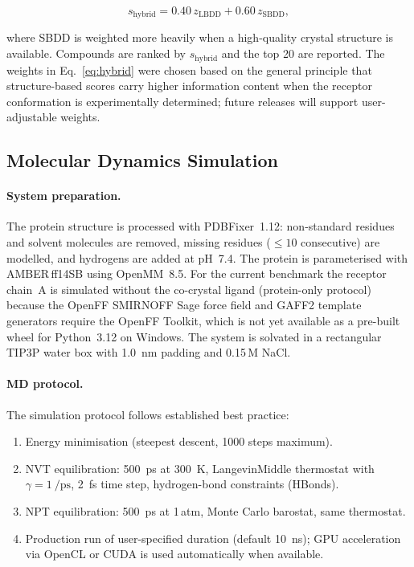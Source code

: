 \documentclass[journal=jcisd8,manuscript=article]{achemso}
\begin{document}
\begin{equation}
  s_{\mathrm{hybrid}} = 0.40\,z_{\mathrm{LBDD}} + 0.60\,z_{\mathrm{SBDD}},
  \label{eq:hybrid}
\end{equation}

where SBDD is weighted more heavily when a high-quality crystal structure
is available.  Compounds are ranked by $s_{\mathrm{hybrid}}$ and the top
20 are reported.  The weights in Eq.~\ref{eq:hybrid} were chosen based
on the general principle that structure-based scores carry higher
information content when the receptor conformation is experimentally
determined; future releases will support user-adjustable weights.

\subsection{Molecular Dynamics Simulation}

\paragraph{System preparation.}
The protein structure is processed with PDBFixer~1.12:\cite{eastman2024openmm8}
non-standard residues and solvent molecules are removed, missing residues
($\leq 10$ consecutive) are modelled, and hydrogens are added at pH~7.4.
The protein is parameterised with AMBER\,ff14SB\cite{maier2015ff14sb} using
OpenMM~8.5.\cite{eastman2024openmm8}  For the current benchmark the
receptor chain~A is simulated without the co-crystal ligand
(protein-only protocol) because the OpenFF SMIRNOFF Sage force field and
GAFF2 template generators require the OpenFF Toolkit,\cite{qiu2021forcefield}
which is not yet available as a pre-built wheel for Python~3.12 on Windows.
The system is solvated in a rectangular TIP3P\cite{jorgensen1983comparison}
water box with \SI{1.0}{\nano\meter} padding and 0.15\,M NaCl.

\paragraph{MD protocol.}
The simulation protocol follows established best practice:\cite{maier2015ff14sb}
\begin{enumerate}
  \item Energy minimisation (steepest descent, 1000 steps maximum).
  \item NVT equilibration: \SI{500}{\pico\second} at \SI{300}{\kelvin},
        LangevinMiddle thermostat with $\gamma = \SI{1}{\per\pico\second}$,
        \SI{2}{\femto\second} time step, hydrogen-bond constraints (HBonds).
  \item NPT equilibration: \SI{500}{\pico\second} at 1\,atm,
        Monte Carlo barostat, same thermostat.
  \item Production run of user-specified duration (default \SI{10}{\nano\second});
        GPU acceleration via OpenCL or CUDA is used automatically when available.
\end{enumerate}
\end{document}
